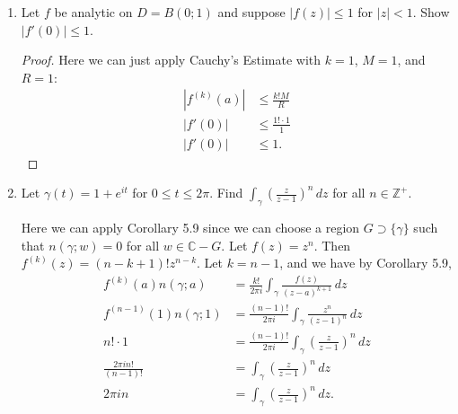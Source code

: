 \documentclass[11pt,oneside,english]{amsart}
\theoremstyle{definition}
\newcommand{\MB}[1]{\mathbb{#1}}
\begin{document}
\begin{enumerate}[leftmargin=*]
\begin{proof}
Here we employ Corollary 5.9. In that statement, let $f(z)=1$, and $k\geq 1$. Then $f^{(k)}(a)=0$ for all $k\geq 1$, so
\begin{align*}
f^{(k)}(a)n(\gamma;a)&=\frac{k!}{2\pi i}\int_\gamma \frac{f(z)}{(z-a)^{k+1}}\,dz\\[2mm]
0\cdot n(\gamma;a)&=\frac{k!}{2\pi i}\int_\gamma \frac{f(z)}{(z-a)^{k+1}}\,dz\\[2mm]
0&=\int_\gamma \frac{f(z)}{(z-a)^{k+1}}\,dz\\[2mm]
0&=\int_\gamma \frac{f(z)}{(z-a)^{n}}\,dz\\[2mm]
\end{align*}
for $n\geq 2$.
\end{proof}




\item Let $f$ be analytic on $D=B(0;1)$ and suppose $|f(z)|\leq 1$ for $|z|<1$. Show $|f'(0)|\leq 1$.

\begin{proof}
Here we can just apply Cauchy's Estimate with $k=1$, $M=1$, and $R=1$:
\begin{align*}
|f^{(k)}(a)|&\leq \frac{k!M}{R}\\[2mm]
|f'(0)|&\leq\frac{1!\cdot1}{1}\\[2mm]
|f'(0)|&\leq 1.
\end{align*}
\end{proof}


\pagebreak


\item Let $\gamma(t)=1+e^{it}$ for $0\leq t\leq 2\pi$. Find $\displaystyle \int_\gamma\left(\frac{z}{z-1}\right)^n\,dz$ for all $n\in\MB{Z}^+$.

Here we can apply Corollary 5.9 since we can choose a region $G\supset \{\gamma\}$ such that $n(\gamma;w)=0$ for all $w\in \MB{C}-G$. Let $f(z)=z^n$. Then $f^{(k)}(z)=(n-k+1)!z^{n-k}$. Let $k=n-1$, and we have by Corollary 5.9,
\begin{align*}
f^{(k)}(a)n(\gamma;a)&=\frac{k!}{2\pi i}\int_\gamma \frac{f(z)}{(z-a)^{k+1}}\,dz\\[2mm]
f^{(n-1)}(1)n(\gamma;1)&=\frac{(n-1)!}{2\pi i}\int_\gamma \frac{z^n}{(z-1)^{n}}\,dz\\[2mm]
n!\cdot1&=\frac{(n-1)!}{2\pi i}\int_\gamma \left(\frac{z}{z-1}\right)^n\,dz\\[2mm]
\frac{2\pi i n!}{(n-1)!}&=\int_\gamma \left(\frac{z}{z-1}\right)^n\,dz\\[2mm]
2\pi i n&=\int_\gamma \left(\frac{z}{z-1}\right)^n\,dz.
\end{align*}





\end{enumerate}
\end{document}
